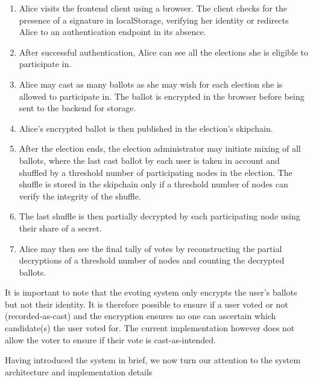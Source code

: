 \begin{enumerate}
\item Alice visits the frontend client using a browser. The client checks for the presence of a signature in localStorage, verifying her identity or redirects Alice to an authentication endpoint in its absence.
\item After successful authentication, Alice can see all the elections she is eligible to participate in.
\item Alice may cast as many ballots as she may wish for each election she is allowed to participate in. The ballot is encrypted in the browser before being sent to the backend for storage.
\item Alice's encrypted ballot is then published in the election's skipchain.
\item After the election ends, the election administrator may initiate mixing of all ballots, where the last cast ballot by each user is taken in account and shuffled by a threshold number of participating nodes in the election. The shuffle is stored in the skipchain only if a threshold number of nodes can verify the integrity of the shuffle.
\item The last shuffle is then partially decrypted by each participating node using their share of a secret.
\item Alice may then see the final tally of votes by reconstructing the partial decryptions of a threshold number of nodes and counting the decrypted ballots.
\end{enumerate}

It is important to note that the evoting system only encrypts the user's ballots but not their identity. It is therefore possible to ensure if a user voted or not (recorded-as-cast) and the encryption ensures no one can ascertain which candidate(s) the user voted for. The current implementation however does not allow the voter to ensure if their vote is cast-as-intended.

Having introduced the system in brief, we now turn our attention to the system architecture and implementation details